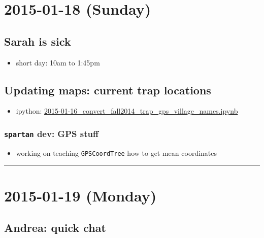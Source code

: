 \documentclass[letterpaper]{scrartcl}
\begin{document}
\section{2015-01-18 (Sunday)}\label{sunday-1}

\subsection{Sarah is sick}\label{sarah-is-sick}

\begin{itemize}
\itemsep1pt\parskip0pt
\item
  short day: 10am to 1:45pm
\end{itemize}

\subsection{Updating maps: current trap
locations}\label{updating-maps-current-trap-locations-1}

\begin{itemize}
\itemsep1pt\parskip0pt
\item
  ipython:
  \href{file:///home/gus/Dropbox/common/ipy_notebooks/YALE/maps_stuff/2015-01-16_convert_fall2014_trap_gps_village_names.ipynb}{2015-01-16\_convert\_fall2014\_trap\_gps\_village\_names.ipynb}
\end{itemize}

\subsubsection{\texttt{spartan} dev: GPS
stuff}\label{spartan-dev-gps-stuff-1}

\begin{itemize}
\itemsep1pt\parskip0pt
\item
  working on teaching \texttt{GPSCoordTree} how to get mean coordinates
\end{itemize}

\begin{center}\rule{0.5\linewidth}{\linethickness}\end{center}

\section{2015-01-19 (Monday)}\label{monday-2}

\subsection{Andrea: quick chat}\label{andrea-quick-chat}
\end{document}

